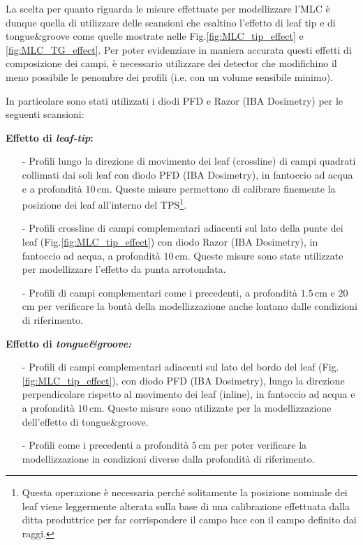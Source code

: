 La scelta per quanto riguarda le misure effettuate per modellizzare l'MLC è dunque quella di utilizzare delle scansioni che esaltino l'effetto di leaf tip e di tongue\&{}groove come quelle mostrate nelle Fig.\ref{fig:MLC_tip_effect} e \ref{fig:MLC_TG_effect}. Per poter evidenziare in maniera accurata questi effetti di composizione dei campi, è necessario utilizzare dei detector che modifichino il meno possibile le penombre dei profili (i.e. con un volume sensibile minimo).

In particolare sono stati utilizzati i diodi PFD e Razor (IBA Dosimetry) per le seguenti scansioni:\vspace*{.2cm}

\textbf{Effetto di \textit{leaf-tip}:}
\begin{itemize}
\item[-] Profili lungo la direzione di movimento dei leaf (crossline) di campi quadrati collimati dai soli leaf con diodo PFD (IBA Dosimetry), in fantoccio ad acqua e a profondità $10\,$cm. Queste misure permettono di calibrare finemente la posizione dei leaf all'interno del TPS\footnote{Questa operazione è necessaria perché solitamente la posizione nominale dei leaf viene leggermente alterata sulla base di una calibrazione effettuata dalla ditta produttrice per far corrispondere il campo luce con il campo definito dai raggi.}.
\item[-] Profili crossline di campi complementari adiacenti sul lato della punte dei leaf (Fig.\ref{fig:MLC_tip_effect}) con diodo Razor (IBA Dosimetry), in fantoccio ad acqua, a profondità $10\,$cm. Queste misure sono state utilizzate per modellizzare l'effetto da punta arrotondata.
\item[-] Profili di campi complementari come i precedenti, a profondità $1.5\,$cm e $20\,$cm per verificare la bontà della modellizzazione anche lontano dalle condizioni di riferimento.
\end{itemize}

\textbf{Effetto di \textit{tongue\&{}groove:}}
\begin{itemize}
\item[-] Profili di campi complementari adiacenti sul lato del bordo del leaf (Fig.\ref{fig:MLC_tip_effect}), con diodo PFD (IBA Dosimetry), lungo la direzione perpendicolare rispetto al movimento dei leaf (inline), in fantoccio ad acqua e a profondità $10\,$cm. Queste misure sono utilizzate per la modellizzazione dell'effetto di tongue\&{}groove.
\item[-] Profili come i precedenti a profondità $5\,$cm per poter verificare la modellizzazione in condizioni diverse dalla profondità di riferimento.
\end{itemize}




